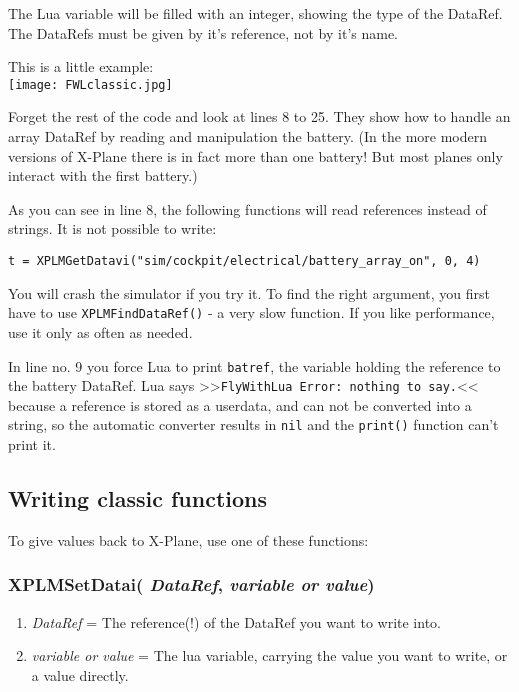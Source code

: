 \documentclass[11pt,parskip=half,a4paper]{scrartcl}
\begin{document}
The Lua variable will be filled with an integer, showing the type of the DataRef. The DataRefs must be given by it's reference, not by it's name.

\newpage
This is a little example:\\
\texttt{[image: FWLclassic.jpg]}

Forget the rest of the code and look at lines 8 to 25. They show how to handle an array DataRef by reading and manipulation the battery. (In the more modern versions of X-Plane there is in fact more than one battery! But most planes only interact with the first battery.)

As you can see in line 8, the following functions will read references instead of strings. It is not possible to write:

\verb|t = XPLMGetDatavi("sim/cockpit/electrical/battery_array_on", 0, 4)|

You will crash the simulator if you try it. To find the right argument, you first have to use \verb|XPLMFindDataRef()| - a very slow function. If you like performance, use it only as often as needed.

In line no. 9 you force Lua to print \verb|batref|, the variable holding the reference to the battery DataRef. Lua says >>\verb|FlyWithLua Error: nothing to say.|<< because a reference is stored as a userdata, and can not be converted into a string, so the automatic converter results in \verb|nil| and the \verb|print()| function can't print it.

\newpage
\subsection{Writing classic functions}

To give values back to X-Plane, use one of these functions:

\subsubsection{XPLMSetDatai( \emph{DataRef}, \emph{variable or value})}

\begin{enumerate}
	\item \emph{DataRef} = The reference(!) of the DataRef you want to write into.
	\item \emph{variable or value} = The lua variable, carrying the value you want to write, or a value directly.
\end{enumerate}
\end{document}
